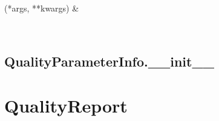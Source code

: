 \documentclass[letterpaper,10pt,english]{sphinxmanual}
\begin{document}
\begin{fulllineitems}
\begin{savenotes}
\begin{longtable}[c]{}
\endlastfoot

\sphinxAtStartPar
{\hyperref[\detokenize{generated/quality_assessment.data_types.QualityParameterInfo.__init__:quality_assessment.data_types.QualityParameterInfo.__init__}]{}}(*args, **kwargs)
&
\sphinxAtStartPar

\\
\hline
\end{longtable}\sphinxatlongtableend\end{savenotes}


\subsection{QualityParameterInfo.\_\_init\_\_}
\label{\detokenize{generated/quality_assessment.data_types.QualityParameterInfo.__init__:qualityparameterinfo-init}}\label{\detokenize{generated/quality_assessment.data_types.QualityParameterInfo.__init__::doc}}

\begin{fulllineitems}
\label{\detokenize{generated/quality_assessment.data_types.QualityParameterInfo.__init__:quality_assessment.data_types.QualityParameterInfo.__init__}}
\end{fulllineitems}


\end{fulllineitems}



\section{QualityReport}
\label{\detokenize{generated/quality_assessment.data_types.QualityReport:qualityreport}}\label{\detokenize{generated/quality_assessment.data_types.QualityReport::doc}}
\end{document}
